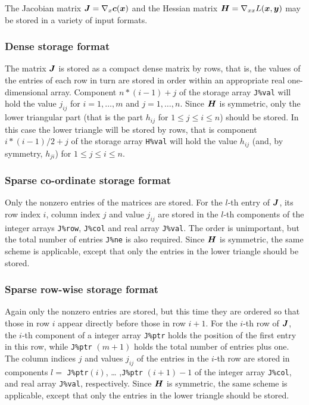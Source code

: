 \documentclass{galahad}
\begin{document}

\galmatrix
The Jacobian matrix ${\bm{J}} = \nabla_x{\bm{c}}({\bm{x}})$ and the Hessian matrix ${\bm{H}} = \nabla_{xx} L({\bm{x}},{\bm{y}})$
may be stored in a variety of input formats.

\subsubsection{Dense storage format}\label{dense}
The matrix ${\bm{J}}$ is stored as a compact 
dense matrix by rows, that is, the values of the entries of each row in turn are
stored in order within an appropriate real one-dimensional array.
Component $n \ast (i-1) + j$ of the storage array {\tt J\%val} will hold the 
value $j_{ij}$ for $i = 1, \ldots , m$ and $j = 1, \ldots , n$.
Since ${\bm{H}}$ is symmetric, only the lower triangular part (that is the part 
$h_{ij}$ for $1 \leq j \leq i \leq n$) should be stored.  In this case
the lower triangle will be stored by rows, that is 
component $i \ast (i-1)/2 + j$ of the storage array {\tt H\%val}  
will hold the value $h_{ij}$ (and, by symmetry, $h_{ji}$)
for $1 \leq j \leq i \leq n$.

\subsubsection{Sparse co-ordinate storage format}\label{coordinate}
Only the nonzero entries of the matrices are stored. For the $l$-th
entry of ${\bm{J}}$, its row index $i$, column index $j$ and value
$j_{ij}$ are stored in the $l$-th components of the integer arrays
{\tt J\%row}, {\tt J\%col} and real array {\tt J\%val}.  The order is
unimportant, but the total number of entries {\tt J\%ne} is also
required.  Since ${\bm{H}}$ is symmetric, the same scheme is applicable,
except that only the entries in the lower triangle should be stored.

\subsubsection{Sparse row-wise storage format}\label{rowwise}
Again only the nonzero entries are stored, but this time they are
ordered so that those in row $i$ appear directly before those in row
$i+1$. For the $i$-th row of ${\bm{J}}$, the $i$-th component of a integer
array {\tt J\%ptr} holds the position of the first entry in this row,
while {\tt J\%ptr} $(m+1)$ holds the total number of entries plus one.
The column indices $j$ and values $j_{ij}$ of the entries in the
$i$-th row are stored in components $l =$ {\tt J\%ptr}$(i)$, \ldots
,{\tt J\%ptr} $(i+1)-1$ of the integer array {\tt J\%col}, and real
array {\tt J\%val}, respectively.  Since ${\bm{H}}$ is symmetric, the same
scheme is applicable, except that only the entries in the lower
triangle should be stored.
\end{document}
